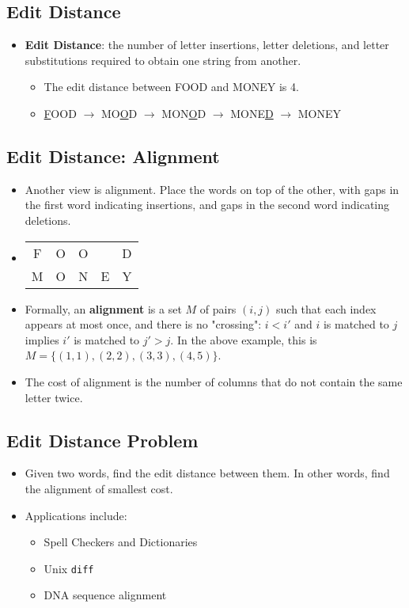 \documentclass[12pt]{article}
\begin{document}
\subsection{Edit Distance}
\begin{itemize}
    \item \textbf{Edit Distance}: the number of letter insertions, letter deletions, and letter substitutions required to obtain one string from another.
    \begin{itemize}
        \item The edit distance between FOOD and MONEY is 4.
        \item \underline{F}OOD $\rightarrow$ MO\underline{O}D $\rightarrow$ MON\underline{O}D $\rightarrow$ MONE\underline{D} $\rightarrow$ MONEY
    \end{itemize}
\end{itemize}

\subsection{Edit Distance: Alignment}
\begin{itemize}
    \item Another view is alignment. Place the words on top of the other, with gaps in the first word indicating insertions, and gaps in the second word indicating deletions.
    \item[] 
        \begin{center}
            \begin{tabular}{c c c c c}
                F & O & O &  & D \\
                M & O & N & E & Y \\
            \end{tabular}
        \end{center}
    \item Formally, an \textbf{alignment} is a set $M$ of pairs $(i, j)$ such that each index appears at most once, and there is no "crossing": $i < i'$ and $i$ is matched to $j$ implies $i'$ is matched to $j' > j$. In the above example, this is $M = \{ (1, 1), (2, 2), (3, 3), (4, 5) \}$.
    \item The cost of alignment is the number of columns that do not contain the same letter twice.
\end{itemize}

\subsection{Edit Distance Problem}
\begin{itemize}
    \item Given two words, find the edit distance between them. In other words, find the alignment of smallest cost.
    \item Applications include:
    \begin{itemize}
        \item Spell Checkers and Dictionaries
        \item Unix \texttt{diff}
        \item DNA sequence alignment
    \end{itemize}
\end{itemize}
\end{document}
